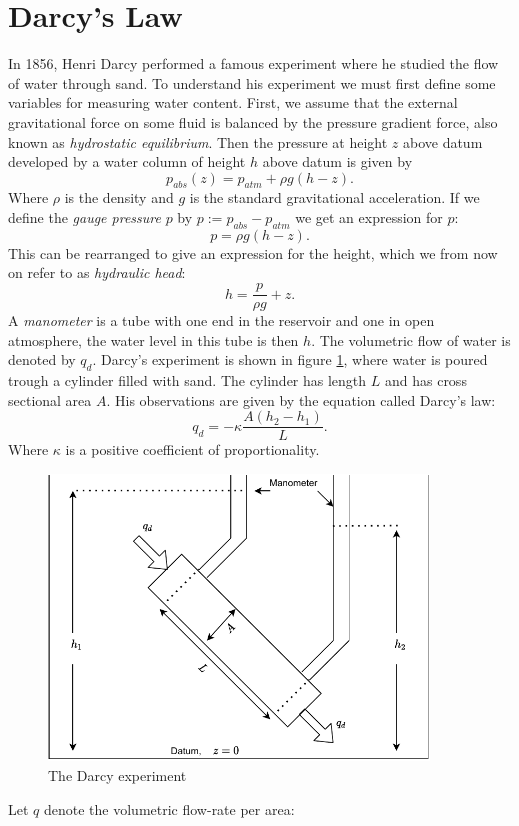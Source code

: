 \documentclass[../Main/main.tex]{subfiles}
\begin{document}
\section*{Darcy's Law}
In 1856, Henri Darcy performed a famous experiment where he studied the flow of water through sand. To understand his experiment we must first define some variables for measuring water content. First, we assume that the external gravitational force on some fluid is balanced by the pressure gradient force, also known as \emph{hydrostatic equilibrium}. Then the pressure at height $z$ above datum developed by a water column of height $h$ above datum is given by
\begin{equation*}
p_{abs}(z) = p_{atm} + \rho g(h-z).
\end{equation*}
Where $\rho$ is the density and $g$ is the standard gravitational acceleration.
If we define the \emph{gauge pressure} $p$ by $p := p_{abs}-p_{atm}$ we get an expression for $p$:
\begin{equation*}
p = \rho g(h-z).
\end{equation*}
This can be rearranged to give an expression for the height, which we from now on refer to as \emph{hydraulic head}:
\begin{equation}\label{eq:hydraulic}
h = \frac{p}{\rho g} + z.
\end{equation}
A \emph{manometer} is a tube with one end in the reservoir and one in open atmosphere, the water level in this tube is then $h$. The volumetric flow of water is denoted by $q_d$. Darcy's experiment is shown in figure \ref{fig:darcy}, where water is poured trough a cylinder filled with sand. The cylinder has length $L$ and has cross sectional area $A$. His observations are given by the equation called Darcy's law:
\begin{equation}
q_d = -\kappa \frac{A(h_2-h_1)}{L}.
\end{equation}
Where $\kappa$ is a positive coefficient of proportionality.
\begin{figure}[h]
\centering
\includegraphics[width=0.9\textwidth]{Darcy experiment.pdf}
\caption{The Darcy experiment}
\label{fig:darcy}
\end{figure}Let $q$ denote the volumetric flow-rate per area:
\end{document}
